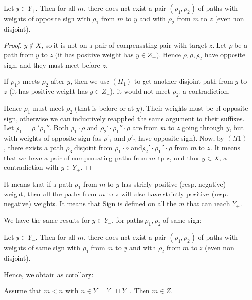 			
\begin{lemma}
	\label{lemma10}
		Let $y \in Y_+$. Then for all $m$, there does not exist a pair $(\rho_1,\rho_2)$ 
		of paths  with weights of opposite sign with $\rho_1$ from $m$ to $y$ and 
		with $\rho_2$ from $m$ to $z$ (even non disjoint).
\end{lemma}

\begin{proof}
  $y \notin X$, so it is not on a pair of compensating pair with target $z$.
  Let $\rho$ be a path from $y$ to $z$ (it has positive weight has $y \in Z_+$).
  Hence $\rho_1 \rho, \rho_2$ have opposite sign, and they must meet before $z$.

  If $\rho_1 \rho$ meets $\rho_2$ after $y$, then we use $(H_1)$ to get another disjoint path from $y$ to $z$ (it has positive weight has $y \in Z_+$), it would not meet $\rho_2$, a contradiction.

  Hence $\rho_1$ must meet $\rho_2$ (that is before or at $y$).
  Their weights must be of opposite sign, otherwise we can inductively reapplied the same argument to their suffixes.
  Let $\rho_1=\rho_1'\rho_1''$.
  Both $\rho_1 \cdot \rho$ and $\rho_2' \cdot \rho_1'' \cdot \rho$
  are from $m$ to $z$ going through $y$, but with weights of opposite sign (as $\rho'_1$ and $\rho'_2$ have opposite sign).
  Now, by $(H1)$, there exists a path $\rho_3$ disjoint from $\rho_1 \cdot \rho$ and$\rho_2' \cdot \rho_1'' \cdot \rho$ from $m$ to $z$. It means that we have a pair of compensating paths from $m$ tp $z$, and thus $y \in X$, a contradiction with $y \in Y_+$. 
\end{proof}

It means that if a path $\rho_1$ from $m$ to $y$ has stricly positive (resp. negative) weight, then all the paths from $m$ to $z$ will also have strictly positive (resp. negative) weights. It means that Sign is defined on all the $m$ that can reach $Y_+$.

We have the same results for $y \in Y_-$, for paths $\rho_1, \rho_2$ of same sign:

\begin{lemma}
	\label{lemma11}
	Let $y \in Y_-$. Then for all $m$, there does not exist a pair $(\rho_1,\rho_2)$ 
	of paths with weights of same sign with $\rho_1$ from $m$ to $y$ and 
	with $\rho_2$ from $m$ to $z$ (even non disjoint).
\end{lemma}

Hence, we obtain as corollary:

\begin{corollary}
\label{cor:simple}
Assume that $m < n$ with $n \in Y= Y_+ \sqcup Y_-$.
Then $m \in Z$.
\end{corollary}

